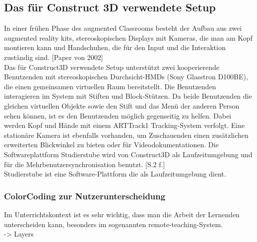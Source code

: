 \documentclass[deutsch]{llncs}
\begin{document}
\subsection{Das für Construct 3D verwendete Setup}
\label{subsec:}
In einer frühen Phase des augmented Classrooms besteht der Aufbau aus zwei augmented reality kits, stereoskopischen Displays mit Kameras, die man am Kopf montieren kann und Handschuhen, die für den Input und die Interaktion zuständig sind. [Paper von 2002]
\noindent \\
Das für Construct3D verwendete Setup unterstützt zwei kooperierende Benutzenden mit stereoskopischen Durchsicht-HMDs 
(Sony Glasstron D100BE), die einen gemeinsamen virtuellen Raum bereitstellt. Die Benutzenden interagieren im System mit Stiften und Block-Stützen. 
Da beide Benutzenden die gleichen virtuellen Objekte sowie den Stift und das Menü der anderen Person sehen können, ist es den Benutzenden möglich 
gegenseitig zu helfen. Dabei werden Kopf und Hände mit einem ARTTrack1 Tracking-System verfolgt. Eine stationäre Kamera ist ebenfalls vorhanden, um Zuschauenden
einen zusätzlichen erweiterten Blickwinkel zu bieten oder für Videodokumentationen. Die Softwareplattform Studierstube wird von Construct3D als 
Laufzeitumgebung und für die Mehrbenutzersynchronisation benutzt. [S.2 f.]\\
Studierstube ist eine Software-Plattform die als Laufzeitumgebung dient. 
\subsubsection{ColorCoding zur Nutzerunterscheidung} 
Im Unterrichtskontext ist es sehr wichtig, dass man die Arbeit der Lernenden unterscheiden kann, besonders im sogenannten remote-teaching-System. \\
-> Layers
\end{document}
